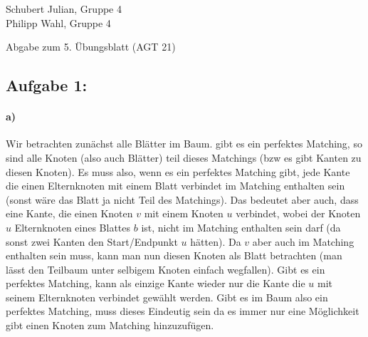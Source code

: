 \documentclass[a4paper]{article}
\begin{document}
\begin{small}
    \noindent
    Schubert Julian, Gruppe 4 \\
    Philipp Wahl, Gruppe 4
\end{small}
\bigskip

\begin{center}
    \LARGE Abgabe zum 5. Übungsblatt (AGT 21)
\end{center}
\smallskip
\subsection*{Aufgabe 1:}
\paragraph{a)}
Wir betrachten zunächst alle Blätter im Baum. gibt es ein perfektes Matching, so 
sind alle Knoten (also auch Blätter) teil dieses Matchings (bzw es gibt Kanten
zu diesen Knoten). Es muss also, wenn es ein perfektes Matching gibt, jede Kante
die einen Elternknoten mit einem Blatt verbindet im Matching enthalten sein (sonst
wäre das Blatt ja nicht Teil des Matchings). Das bedeutet aber auch, dass eine Kante,
die einen Knoten $v$ mit einem Knoten $u$ verbindet, wobei der Knoten $u$ Elternknoten
eines Blattes $b$ ist, nicht im Matching enthalten sein darf (da sonst zwei Kanten
den Start/Endpunkt $u$ hätten). Da $v$ aber auch im Matching enthalten sein muss, 
kann man nun diesen Knoten als Blatt betrachten (man lässt den Teilbaum unter 
selbigem Knoten einfach wegfallen). Gibt es ein perfektes Matching, kann als 
einzige Kante wieder nur die Kante die $u$ mit seinem Elternknoten verbindet gewählt
werden. Gibt es im Baum also ein perfektes Matching, muss dieses Eindeutig sein da 
es immer nur eine Möglichkeit gibt einen Knoten zum Matching hinzuzufügen.
\end{document}

